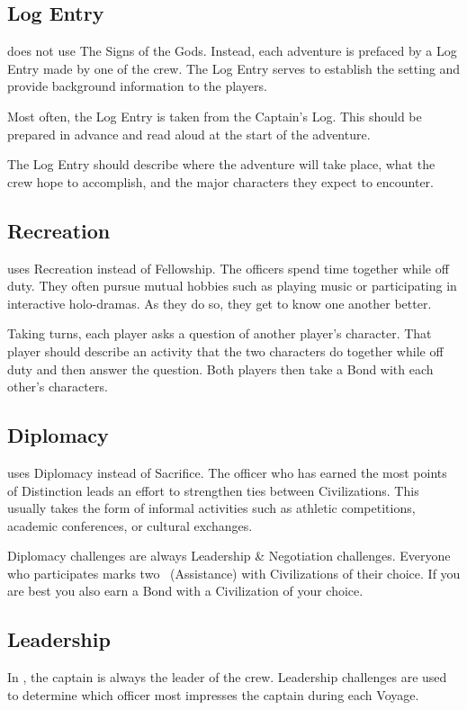 \documentclass[11pt, a5paper, parskip=half-, DIV=12]{scrartcl}
\begin{document}
\subsection*{Log Entry}
\ENDEAVOUR{} does not use The Signs of the Gods. Instead, each adventure is prefaced by a Log Entry made by one of the crew. The Log Entry serves to establish the setting and provide background information to the players.

Most often, the Log Entry is taken from the Captain's Log.  This should be prepared in advance and read aloud at the start of the adventure.

The Log Entry should describe where the adventure will take place, what the crew hope to accomplish, and the major characters they expect to encounter.

\newpage

\subsection*{Recreation}
\ENDEAVOUR{} uses Recreation instead of Fellowship. The officers spend time together while off duty. They often pursue mutual hobbies such as playing music or participating in interactive holo-dramas. As they do so, they get to know one another better. 

Taking turns, each player asks a question of another player's character. That player should describe an activity that the two characters do together while off duty and then answer the question. Both players then take a Bond with each other's characters. 

\subsection*{Diplomacy}
\ENDEAVOUR{} uses Diplomacy instead of Sacrifice. The officer who has earned the most points of Distinction leads an effort to strengthen ties between Civilizations. This usually takes the form of informal activities such as athletic competitions, academic conferences, or cultural exchanges.

Diplomacy challenges are always Leadership \& Negotiation challenges.  Everyone who participates marks two ~(Assistance) with Civilizations of their choice. If you are best you also earn a Bond with a Civilization of your choice.

\subsection*{Leadership}
In \ENDEAVOUR{}, the captain is always the leader of the crew. Leadership challenges are used to determine which officer most impresses the captain during each Voyage.
\end{document}
